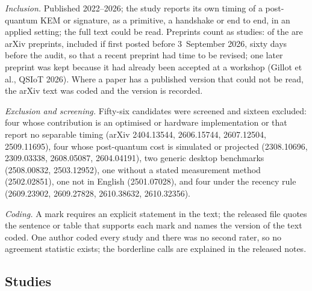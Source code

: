 \documentclass[acmsmall,screen,nonacm]{acmart}
\begin{document}
\emph{Inclusion.} Published 2022--2026; the study reports its own timing of a
post-quantum KEM or signature, as a primitive, a handshake or end to end, in an
applied setting; the full text could be read. Preprints count as studies:
\NauditPreprints{} of the \NauditN{} are arXiv preprints, included if first
posted before 3~September 2026, sixty days before the audit, so that a recent
preprint had time to be revised; one later preprint was kept because it had
already been accepted at a workshop (Gillot et al., QSIoT 2026). Where a paper has a published version that
could not be read, the arXiv text was coded and the version is recorded.

\emph{Exclusion and screening.} Fifty-six candidates were screened and
sixteen excluded: four whose contribution is an optimised or hardware
implementation or that report no separable timing (arXiv 2404.13544,
2606.15744, 2607.12504, 2509.11695), four whose post-quantum cost is
simulated or projected (2308.10696, 2309.03338, 2608.05087, 2604.04191), two
generic desktop benchmarks (2508.00832, 2503.12952), one without a stated
measurement method (2502.02851), one not in English (2501.07028), and four
under the recency rule (2609.23902, 2609.27828, 2610.38632, 2610.32356).

\emph{Coding.} A mark requires an explicit statement in the text; the
released file quotes the sentence or table that supports each mark and names
the version of the text coded. One author coded every study and there was no
second rater, so no agreement statistic exists; the borderline calls are
explained in the released notes.

\subsection{Studies}

{\footnotesize

}

\clearpage


\end{document}
